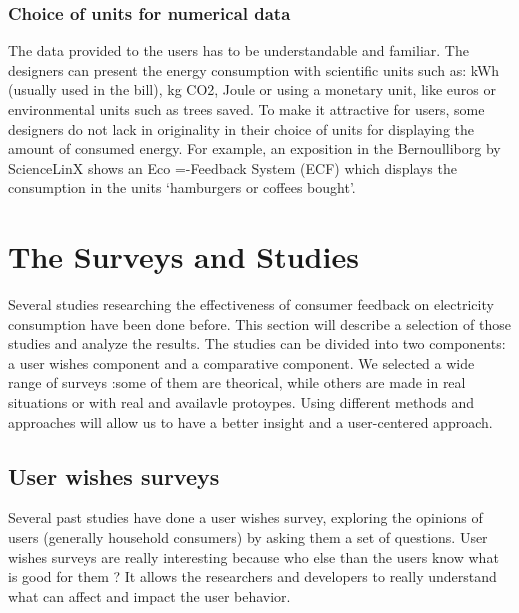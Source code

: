 \documentclass[journal]{vgtc}                %
\begin{document}
\subsubsection{Choice of units for numerical data}
The data provided to the users has to be understandable and familiar. The designers can present the energy consumption with scientific units such as: kWh (usually used in the bill), kg CO2, Joule or using a monetary unit, like euros or environmental units such as trees saved.
To make it attractive for users, some designers do not lack in originality in their choice of units for displaying the amount of consumed energy. For example, an exposition in the Bernoulliborg by ScienceLinX shows an Eco =-Feedback System (ECF) which displays the consumption in the units ‘hamburgers or coffees bought’.


\section{The Surveys and Studies}
Several studies researching the effectiveness of consumer feedback on electricity consumption have been done before.
This section will describe a selection of those studies and analyze the results.
The studies can be divided into two components: a user wishes component and a comparative component.
We selected a wide range of surveys :some of them are theorical, while others are made in real situations or with real and availavle protoypes. Using different methods and approaches will allow us to have a better insight and a user-centered approach.

\subsection{User wishes surveys}
Several past studies have done a user wishes survey, exploring the opinions of users (generally household consumers) by asking them a set of questions. 
User wishes surveys are really interesting because who else than the users know what is good for them ? It allows the researchers and developers to really understand what can affect and impact the user behavior.
\end{document}
